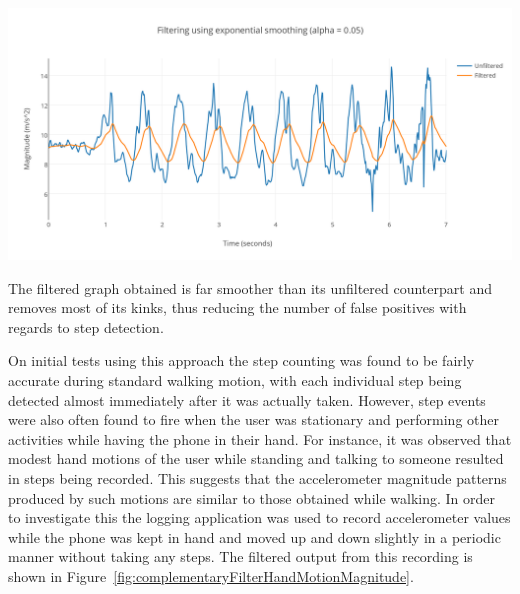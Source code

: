 \documentclass[12pt,a4paper,notitlepage]{report}
\begin{document}
\begin{center}
\includegraphics[scale=0.9]{images/complementaryFilterMagnitude.png}
\label{fig:complementaryFilterMagnitude}
\end{center}

The filtered graph obtained is far smoother than its unfiltered counterpart and removes most of its kinks, thus reducing the number of false positives with regards to step detection.   

On initial tests using this approach the step counting was found to be fairly accurate during standard walking motion, with each individual step being detected almost immediately after it was actually taken. However, step events were also often found to fire when the user was stationary and performing other activities while having the phone in their hand. For instance, it was observed that modest hand motions of the user while standing and talking to someone resulted in steps being recorded. This suggests that the accelerometer magnitude patterns produced by such motions are similar to those obtained while walking. In order to investigate this the logging application was used to record accelerometer values while the phone was kept in hand and moved up and down slightly in a periodic manner without taking any steps. The filtered output from this recording is shown in Figure~\ref{fig:complementaryFilterHandMotionMagnitude}. 
\end{document}

